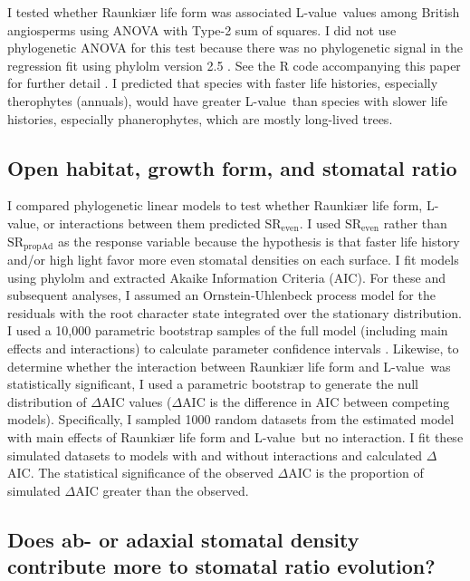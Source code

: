 \documentclass[12pt, oneside]{article}
\newcommand{\pkg}[1]{{\fontseries{b}\selectfont #1}}
\newcommand{\el}{L-value}
\begin{document}
I tested whether Raunki\ae r life form was associated \el~values among British angiosperms using ANOVA with Type-2 sum of squares. I did not use phylogenetic ANOVA for this test because there was no phylogenetic signal in the regression fit using \pkg{phylolm} version 2.5 \citep{Ho_Ane_2014}. See the R code accompanying this paper for further detail \citep{Muir_dryad}. I predicted that species with faster life histories, especially therophytes (annuals), would have greater \el~than species with slower life histories, especially phanerophytes, which are mostly long-lived trees. 

\subsection*{Open habitat, growth form, and stomatal ratio}

I compared phylogenetic linear models to test whether Raunki\ae r life form, \el, or interactions between them predicted $\textrm{SR}_\textrm{even}$. I used $\textrm{SR}_\textrm{even}$ rather than $\textrm{SR}_\textrm{propAd}$ as the response variable because the hypothesis is that faster life history and/or high light favor more even stomatal densities on each surface. I fit models using \pkg{phylolm} and extracted Akaike Information Criteria (AIC). For these and subsequent analyses, I assumed an Ornstein-Uhlenbeck process model for the residuals with the root character state integrated over the stationary distribution. I used a 10,000 parametric bootstrap samples of the full model (including main effects and interactions) to calculate parameter confidence intervals \citep{Boettiger_etal_2012}. Likewise, to determine whether the interaction between Raunki\ae r life form and \el~was statistically significant, I used a parametric bootstrap to generate the null distribution of $\Delta$AIC values ($\Delta$AIC is the difference in AIC between competing models). Specifically, I sampled 1000 random datasets from the estimated model with main effects of Raunki\ae r life form and \el~but no interaction. I fit these simulated datasets to models with and without interactions and  calculated $\Delta$AIC. The statistical significance of the observed $\Delta$AIC is the proportion of simulated $\Delta$AIC greater than the observed.

\subsection*{Does ab- or adaxial stomatal density contribute more to stomatal ratio evolution?}
\end{document}
